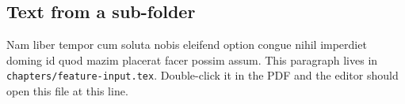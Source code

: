 
\subsection{Text from a sub-folder}
Nam liber tempor cum soluta nobis eleifend option congue nihil imperdiet doming
id quod mazim placerat facer possim assum. This paragraph lives in
\texttt{chapters/feature-input.tex}. Double-click it in the PDF and the editor
should open this file at this line.
